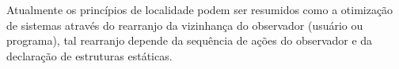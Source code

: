 \documentclass[11pt,a4paper]{article}
\begin{document}
Atualmente os princípios de localidade podem ser resumidos como a otimização de sistemas através do rearranjo da vizinhança do observador (usuário ou programa), tal rearranjo depende da sequência de ações do observador e da declaração de estruturas estáticas.













      
\end{document}

